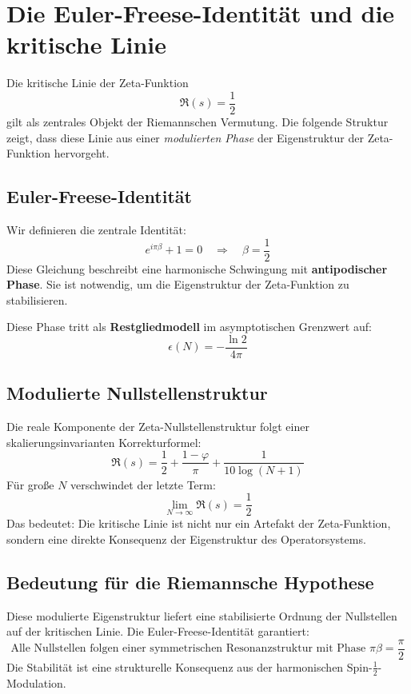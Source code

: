 \section{Die Euler-Freese-Identität und die kritische Linie}

Die kritische Linie der Zeta-Funktion
\[
\Re(s) = \frac{1}{2}
\]
gilt als zentrales Objekt der Riemannschen Vermutung. Die folgende Struktur zeigt, dass diese Linie aus einer \emph{modulierten Phase} der Eigenstruktur der Zeta-Funktion hervorgeht.

\subsection{Euler-Freese-Identität}

Wir definieren die zentrale Identität:
\[
e^{i \pi \beta} + 1 = 0 \quad \Rightarrow \quad \beta = \frac{1}{2}
\]
Diese Gleichung beschreibt eine harmonische Schwingung mit \textbf{antipodischer Phase}. Sie ist notwendig, um die Eigenstruktur der Zeta-Funktion zu stabilisieren. 

Diese Phase tritt als \textbf{Restgliedmodell} im asymptotischen Grenzwert auf:
\[
\epsilon(N) = -\frac{\ln 2}{4\pi}
\]

\subsection{Modulierte Nullstellenstruktur}

Die reale Komponente der Zeta-Nullstellenstruktur folgt einer skalierungsinvarianten Korrekturformel:
\[
\Re(s) = \frac{1}{2} + \frac{1 - \varphi}{\pi} + \frac{1}{10 \log(N+1)}
\]
Für große \( N \) verschwindet der letzte Term:
\[
\lim_{N \to \infty} \Re(s) = \frac{1}{2}
\]
Das bedeutet: Die kritische Linie ist nicht nur ein Artefakt der Zeta-Funktion, sondern eine direkte Konsequenz der Eigenstruktur des Operatorsystems.

\subsection{Bedeutung für die Riemannsche Hypothese}

Diese modulierte Eigenstruktur liefert eine stabilisierte Ordnung der Nullstellen auf der kritischen Linie. Die Euler-Freese-Identität garantiert:
\[
\text{Alle Nullstellen folgen einer symmetrischen Resonanzstruktur mit Phase } \pi \beta = \frac{\pi}{2}
\]
Die Stabilität ist eine strukturelle Konsequenz aus der harmonischen Spin-\(\frac{1}{2}\)-Modulation.

